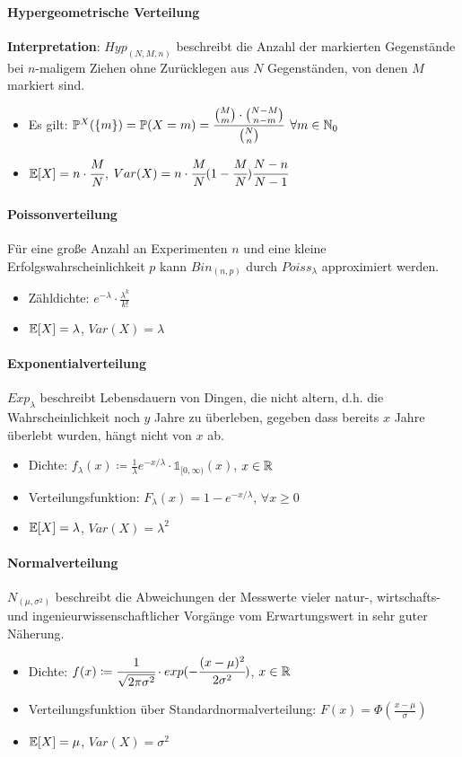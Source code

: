 \newpage
\paragraph{Hypergeometrische Verteilung}
\textbf{Interpretation}: $Hyp_{(N,M,n)}$ beschreibt die Anzahl der markierten Gegenstände bei $n$-maligem Ziehen ohne Zurücklegen aus $N$ Gegenständen, von denen $M$ markiert sind.
\begin{itemize}
	\item Es gilt: $\mathbb{P}^X(\{m\})=\mathbb{P}(X=m)=\cfrac{\binom{M}{m}\cdot\binom{N-M}{n-m}}{\binom{N}{n}}$ \qquad$\forall m\in\mathbb{N}_0$
	\item $\mathbb{E}[X]=n\cdot\cfrac{M}{N}$, $Var(X)=n\cdot\cfrac{M}{N}(1-\cfrac{M}{N})\cfrac{N-n}{N-1}$
\end{itemize}

\paragraph{Poissonverteilung}
Für eine große Anzahl an Experimenten $n$ und eine kleine Erfolgswahrscheinlichkeit $p$ kann $Bin_{(n,p)}$ durch $Poiss_\lambda$ approximiert werden.
\begin{itemize}
	\item Zähldichte: $e^{-\lambda}\cdot\frac{\lambda^k}{k!}$
	\item $\mathbb{E}[X]=\lambda$, $Var(X)=\lambda$
\end{itemize}

\paragraph{Exponentialverteilung}
$Exp_\lambda$ beschreibt Lebensdauern von Dingen, die nicht altern, d.h. die Wahrscheinlichkeit noch $y$ Jahre zu überleben, gegeben dass bereits $x$ Jahre überlebt wurden, hängt nicht von $x$ ab.
\begin{itemize}
	\item Dichte: $f_\lambda(x)\coloneqq\frac{1}{\lambda}e^{-x/\lambda}\cdot\mathds{1}_{[0,\infty)}(x)$, \qquad$x\in\mathbb{R}$
	\item Verteilungsfunktion: $F_\lambda(x)=1-e^{-x/\lambda}$, \qquad$\forall x\geq 0$
	\item $\mathbb{E}[X]=\lambda$, $Var(X)=\lambda^2$
\end{itemize}

\paragraph{Normalverteilung}
$N_{(\mu,\sigma^2)}$ beschreibt die Abweichungen der Messwerte vieler natur-, wirtschafts- und ingenieurwissenschaftlicher Vorgänge vom Erwartungswert in sehr guter Näherung.
\begin{itemize}
	\item Dichte: $f(x)\coloneqq\cfrac{1}{\sqrt{2\pi\sigma^2}}\cdot exp(-\cfrac{(x-\mu)^2}{2\sigma^2})$, \qquad$x\in\mathbb{R}$
	\item Verteilungsfunktion über Standardnormalverteilung: $F(x)=\Phi(\frac{x-\mu}{\sigma})$
	\item $\mathbb{E}[X]=\mu$, $Var(X)=\sigma^2$
\end{itemize}

